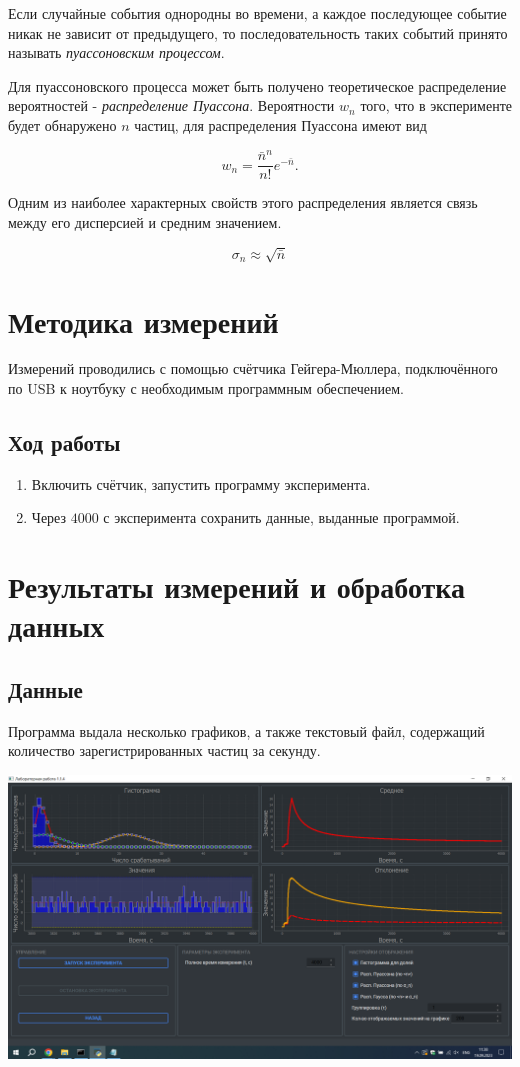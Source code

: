 \documentclass[12pt, a4paper]{article}
\begin{document}
Если случайные события однородны во времени, а каждое последующее событие
никак не зависит от предыдущего, то последовательность таких событий
принято называть \textit{пуассоновским процессом}.


Для пуассоновского процесса может быть получено теоретическое распределение
вероятностей - \textit{распределение Пуассона}. Вероятности $w_n$ того,
что в эксперименте будет обнаружено $n$ частиц, для распределения
Пуассона имеют вид

\[w_n = \frac{\bar{n} ^ n}{n!}e^{-\bar{n}}.\]


Одним из наиболее характерных свойств этого распределения является
связь между его дисперсией и средним значением.

\[\sigma_n\approx\sqrt{\bar{n}}\]


\section{Методика измерений}

Измерений проводились с помощью счётчика Гейгера-Мюллера, подключённого
по USB к ноутбуку с необходимым программным обеспечением.

\subsection{Ход работы}

\begin{enumerate}
    \item Включить счётчик, запустить программу эксперимента.
    \item Через $4000$ с эксперимента сохранить данные, выданные программой.
\end{enumerate}

\section{Результаты измерений и обработка данных}

\subsection{Данные}

Программа выдала несколько графиков, а также текстовый файл, содержащий
количество зарегистрированных частиц за секунду.

\begin{center}
    \includegraphics[width=\textwidth]{image}
\end{center}
\end{document}
